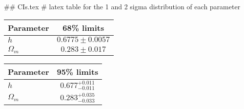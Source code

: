 ## CIs.tex
# latex table for the 1 and 2 sigma distribution of each parameter

\begin{tabular} { l  c}
 Parameter &  68\% limits\\
\hline
{\boldmath$h              $} & $0.6775\pm 0.0057          $\\
{\boldmath$\Omega_m       $} & $0.283\pm 0.017            $\\
\hline
\end{tabular}

\begin{tabular} { l  c}
 Parameter &  95\% limits\\
\hline
{\boldmath$h              $} & $0.677^{+0.011}_{-0.011}   $\\
{\boldmath$\Omega_m       $} & $0.283^{+0.035}_{-0.033}   $\\
\hline
\end{tabular}
